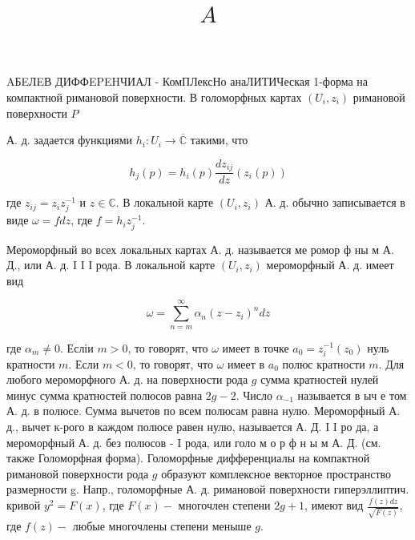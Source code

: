 \documentclass[10pt]{article}
\title{$A$ }
\author{}
\date{}
\begin{document}
\maketitle

AБEЛEВ ДИФФEPEHЧИАЛ - КомПЛексНо анаЛИТИЧеская 1-форма на компактной римановой поверхности. В голоморфных картах $\left(U_{i}, z_{i}\right)$ римановой поверхности $P$



А. д. задается функциями $h_{i}: U_{i} \rightarrow \overline{\mathbb{C}}$ такими, что



\[

h_{j}(p)=h_{i}(p) \frac{d z_{i j}}{d z}\left(z_{i}(p)\right)

\]



где $z_{i j}=z_{i} z_{j}^{-1}$ и $z \in \mathbb{C}$. В локальной карте $\left(U_{i}, z_{i}\right)$ А. д. обычно записывается в виде $\omega=f d z$, где $f=h_{i} z_{j}^{-1}$.



Мероморфный во всех локальных картах А. д. называется ме ромор ф ны м А. Д., или А. д. I I І рода. В локальной карте $\left(U_{i}, z_{i}\right)$ мероморфный А. д. имеет вид



\[

\omega=\sum_{n=m}^{\infty} \alpha_{n}\left(z-z_{i}\right)^{n} d z

\]



где $\alpha_{m} \neq 0$. Есліи $m>0$, то говорят, что $\omega$ имеет в точке $a_{0}=z_{i}^{-1}\left(z_{0}\right)$ нуль кратности $m$. Если $m<0$, то говорят, что $\omega$ имеет в $a_{0}$ полюс кратности $m$. Для любого мероморфного А. д. на поверхности рода $g$ сумма кратностей нулей минус сумма кратностей полюсов равна $2 g-2$. Число $\alpha_{-1}$ называется в ыч е том А. д. в полюсе. Сумма вычетов по всем полюсам равна нулю. Мероморфный А. д., вычет к-рого в каждом полюсе равен нулю, называется А. Д. I I ро да, а мероморфный А. д. без полюсов - I рода, или голо м о р ф н ы м А. Д. (см. также Голоморфная форма). Голоморфные дифференциалы на компактной римановой поверхности рода $g$ образуют комплексное векторное пространство размерности g. Напр., голоморфные А. д. римановой поверхности гиперэллиптич. кривой $y^{2}=F(x)$, где $F(x)-$ многочлен степени $2 g+1$, имеют вид $\frac{f(z) d z}{\sqrt{F(z)}}$, где $f(z)-$ любые многочлены степени меныше $g$.
\end{document}

